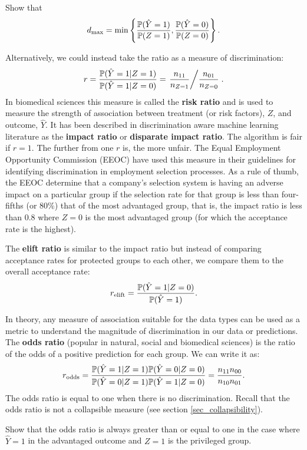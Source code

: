 \begin{lookbox}
Show that 
\[
d_{\max} = \min\left\{ \frac{\mathbb{P}(\hat{Y}=1)}{\mathbb{P}(Z=1)},
                       \frac{\mathbb{P}(\hat{Y}=0)}{\mathbb{P}(Z=0)} \right\}.
\]
\end{lookbox}

Alternatively, we could instead take the ratio as a measure of discrimination:
\[
r = \frac{\mathbb{P}(\hat{Y}=1 | Z=1)}{\mathbb{P}(\hat{Y}=1 | Z=0)}
  = \left. \frac{n_{11}}{n_{Z=1}} \middle/ \frac{n_{01}}{n_{Z=0}} \right. .
\]
In biomedical sciences this measure is called the \textbf{risk ratio} and is used  to measure the strength of association between treatment (or risk factors), $Z$, and outcome, $\hat{Y}$. It has been described in discrimination aware machine learning literature as the \textbf{impact ratio} or \textbf{disparate impact ratio}. The algorithm is fair if $r=1$. The further from one $r$ is, the more unfair. The Equal Employment Opportunity Commission (EEOC) have used this measure in their guidelines for identifying discrimination in employment selection processes\cite{US-EEOC}. As a rule of thumb, the EEOC determine that a company's selection system is having an adverse impact on a particular group if the selection rate for that group is less than four-fifths (or 80\%) that of the most advantaged group, that is, the impact ratio is less than 0.8 where $Z=0$ is the most advantaged group (for which the acceptance rate is the highest).

The \textbf{elift ratio}\cite{Pedreschi} is similar to the impact ratio but instead of comparing acceptance rates for protected groups to each other, we compare them to the overall acceptance rate:
\[
r_{\text{elift}} = \frac{\mathbb{P}(\hat{Y}=1 | Z=0)}{\mathbb{P}(\hat{Y}=1)}.
\]

In theory, any measure of association suitable for the data types can be used as a metric to understand the magnitude of discrimination in our data or predictions. The \textbf{odds ratio} (popular in natural, social and biomedical sciences) is the ratio of the odds of a positive prediction for each group. We can write it as:
\[
r_{\text{odds}}
= \frac{\mathbb{P}(\hat{Y}=1 | Z=1)\mathbb{P}(\hat{Y}=0 | Z=0)}
       {\mathbb{P}(\hat{Y}=0 | Z=1)\mathbb{P}(\hat{Y}=1 | Z=0)}
= \frac{n_{11}n_{00}}{n_{10}n_{01}}.
\]
The odds ratio is equal to one when there is no discrimination. Recall that the odds ratio is not a collapsible measure (see section \ref{sec_collapsibility}).

\begin{lookbox}
Show that the odds ratio is always greater than or equal to one in the case where $\hat{Y}=1$ in the advantaged outcome and $Z=1$ is the privileged group.
\end{lookbox}

